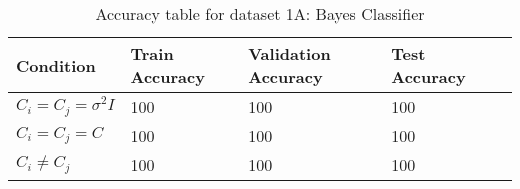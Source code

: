 \def\arraystretch{1.25}
\begin{table}[H]
\centering
\begin{tabular}{l l l l l}
\hline
\hline
\textbf{Condition} & \textbf{Train Accuracy} & \textbf{Validation Accuracy} & \textbf{Test Accuracy}\\
\hline
\hline
$C_{i}=C_{j}=\sigma^{2}I$ & 100 & 100 & 100\\
$C_{i}=C_{j}=C$ & 100 & 100 & 100 \\
$C_{i}\neq C_{j}$ & 100 & 100 & 100 \\
\hline
\end{tabular}
\caption{Accuracy table for dataset 1A: Bayes Classifier}
\end{table}